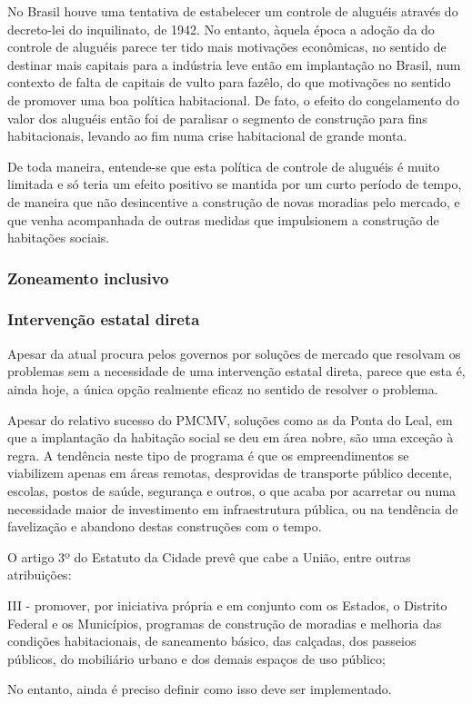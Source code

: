 \documentclass[
	12pt,				%
	oneside,			%
	a4paper,			%
	chapter=TITLE,		%
	section=TITLE,		%
	english,			%
	brazil				%
	]{abntex2}
\begin{document}
\begin{refsection}
No Brasil houve uma tentativa de estabelecer um controle de aluguéis através do
decreto-lei do inquilinato, de 1942. No entanto, àquela época a adoção da do
controle de aluguéis parece ter tido mais motivações econômicas, no sentido de
destinar mais capitais para a indústria leve então em implantação no Brasil, num
contexto de falta de capitais de vulto para fazêlo, do que motivações no sentido
de promover uma boa política habitacional. De fato, o efeito do congelamento do
valor dos aluguéis então foi de paralisar o segmento de construção para fins
habitacionais, levando ao fim numa crise habitacional de grande monta.
\autocite{bonduki_origens_1994}

De toda maneira, entende-se que esta política de controle de aluguéis é muito
limitada e só teria um efeito positivo se mantida por um curto período de tempo,
de maneira que não desincentive a construção de novas moradias pelo mercado, e
que venha acompanhada de outras medidas que impulsionem a construção de
habitações sociais.

\hypertarget{zoneamento-inclusivo}{%
\subsubsection{Zoneamento inclusivo}\label{zoneamento-inclusivo}}

\hypertarget{intervenuxe7uxe3o-estatal-direta}{%
\subsubsection{Intervenção estatal direta}\label{intervenuxe7uxe3o-estatal-direta}}

Apesar da atual procura pelos governos por soluções de mercado que resolvam os
problemas sem a necessidade de uma intervenção estatal direta, parece que esta
é, ainda hoje, a única opção realmente eficaz no sentido de resolver o problema.

Apesar do relativo sucesso do \gls{PMCMV}, soluções como as da Ponta do Leal, em
que a implantação da habitação social se deu em área nobre, são uma exceção à
regra. A tendência neste tipo de programa é que os empreendimentos se viabilizem
apenas em áreas remotas, desprovidas de transporte público decente, escolas,
postos de saúde, segurança e outros, o que acaba por acarretar ou numa
necessidade maior de investimento em infraestrutura pública, ou na tendência de
favelização e abandono destas construções com o tempo.

O artigo 3º do Estatuto da Cidade prevê que cabe a União, entre outras
atribuições:
\begin{citacao}
III - promover, por iniciativa própria e em conjunto com os Estados, o Distrito
Federal e os Municípios, programas de construção de moradias e melhoria das
condições habitacionais, de saneamento básico, das calçadas, dos passeios
públicos, do mobiliário urbano e dos demais espaços de uso público;
\end{citacao}
No entanto, ainda é preciso definir como isso deve ser implementado.


\end{refsection}
\end{document}
